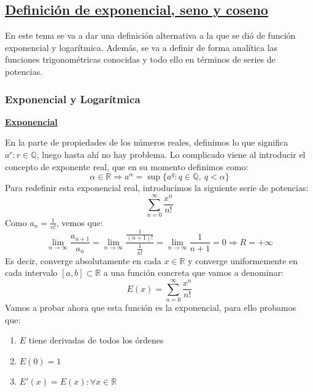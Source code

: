 \documentclass[10pt,a4paper,openright]{book}
\theoremstyle{break}
\begin{document}
\subsection{\underline{Definición de exponencial, seno y coseno}}
En este tema se va a dar una definición alternativa a la que se dió de función exponencial y logarítmica. Además, se va a definir de forma analítica las funciones trigonométricas conocidas y todo ello en términos de series de potencias.

\subsubsection{Exponencial y Logarítmica}
\underline{\textbf{Exponencial}}

En la parte de propiedades de los números reales, definimos lo que significa $a^r: r\in \mathbb Q$, luego hasta ahí no hay problema. Lo complicado viene al introducir el concepto de exponente real, que en su momento definimos como:
$$\alpha \in \mathbb{R}\Rightarrow a^\alpha = \sup\{a^q : q \in \mathbb{Q} ,\  q < \alpha \}$$
Para redefinir esta exponencial real, introducimos la siguiente serie de potencias:
$$\sum_{n=0}^{\infty} \frac{x^n}{n!}$$
Como $a_n = \frac{1}{n!}$, vemos que:
$$\lim_{n \to \infty} \frac{a_{n+1}}{a_n} = \lim_{n \to \infty} \frac{\frac{1}{(n+1)!}}{\frac{1}{n!}} = \lim_{n \to \infty} \frac{1}{n+1} = 0 \Rightarrow R = +\infty$$
Es decir, converge absolutamente en cada $x \in \mathbb{R}$ y converge uniformemente en cada intervalo $[a,b] \subset \mathbb{R}$ a una función concreta que vamos a denominar: 
$$E(x) = \sum_{n = 0}^{\infty} \frac{x^n}{n!}$$
Vamos a probar ahora que esta función es la exponencial, para ello probamos que:
\begin{enumerate}
\item $E$ tiene derivadas de todos los órdenes
\item $E(0) = 1$
\item $E'(x) = E(x) : \forall x \in \mathbb{R}$
\end{enumerate}
\end{document}
